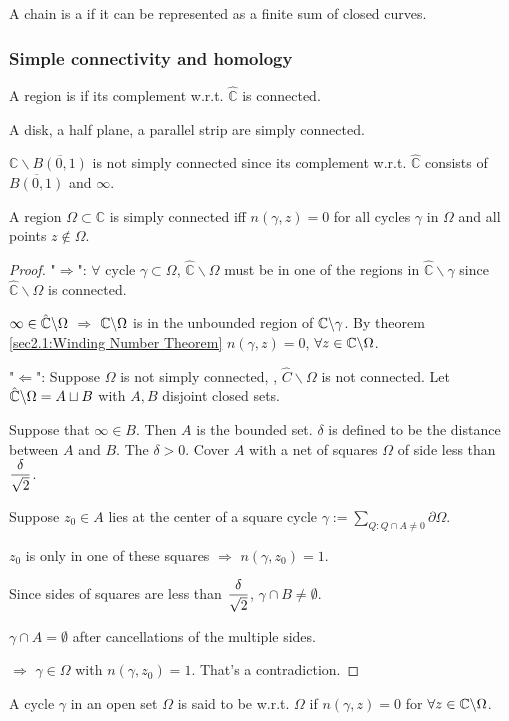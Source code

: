 A chain is a  if it can be represented as a finite sum of closed curves.
\subsubsection{Simple connectivity and homology}
A region is  if its complement w.r.t.  $ \hat{\mathbb C} $ is connected.
\begin{example}
    A disk, a half plane, a parallel strip are simply connected.

     $ \mathbb{C}\backslash \overline{B(0,1)} $ is not simply connected since its complement w.r.t.  $ \hat{\mathbb C} $ consists of  $ \overline{B(0,1)} $ and  $ \infty $.    
\end{example} 
\begin{theorem}\label{thm in sec:4.2: Equivalence of simply connectness}
    A region  $ \Omega\subset \mathbb C $ is simply connected iff $ n(\gamma,z)=0 $ for all cycles  $ \gamma  $ in  $ \Omega  $ and all points  $ z\not\in \Omega $.   
\end{theorem}
\begin{proof}
    "$\Rightarrow$":
    $ \forall   $ cycle  $ \gamma\subset \Omega $,  $ \hat{\mathbb{C}}\backslash \Omega$ must be in one of the regions in  $ \hat{\mathbb C}\backslash\gamma $ since  $ \hat{\mathbb C}\backslash \Omega $  is connected.
    
    $ \infty\in \hat{\mathbb C}\backslash\Omega $ $ \Rightarrow  $  $ \mathbb C\backslash\Omega  $ is in the unbounded region of  $ \mathbb C\backslash \gamma $.  By theorem \ref{sec2.1:Winding Number Theorem}  $ n(\gamma,z)=0 $, $ \forall z\in \mathbb C\backslash\Omega $.
    
    "$ \Leftarrow $": Suppose  $ \Omega  $ is not simply connected, \ie,  $ \hat{C}\backslash\Omega $ is not connected. Let  $ \hat{\mathbb C}\backslash \Omega=A\sqcup B $ with  $ A,B $ disjoint closed sets.
    
    Suppose that  $ \infty\in B $. Then  $ A  $ is the bounded set. $ \delta $ is defined to be the distance between  $ A  $ and  $ B $. The  $ \delta>0 $. Cover  $ A  $ with a net of squares  $ \Omega $   of side less than  $ \displaystyle\frac{\delta}{\sqrt{2}} $.
    
    Suppose  $ z_0\in A  $ lies at the center of a square cycle  $ \gamma:=\sum\limits_{Q:Q\cap A\neq 0}\partial \Omega $.
    
    $ z_0  $ is only in one of these squares  $ \Rightarrow  $ $ n(\gamma,z_0)=1 $.
    
    Since sides of squares are less than  $ \displaystyle\frac{\delta }{\sqrt{2}} $,  $ \gamma\cap B\neq \emptyset $.
    
     $ \gamma\cap A=\emptyset $ after  cancellations of the multiple sides.
     
     $ \Rightarrow  $  $ \gamma\in \Omega $ with  $ n(\gamma,z_0)=1 $. That's a contradiction. 
\end{proof}
A cycle $ \gamma    $ in an open set  $ \Omega  $ is said to be  w.r.t.  $ \Omega  $ if  $ n(\gamma,z)=0  $ for  $ \forall z\in\mathbb C\backslash \Omega $. 

